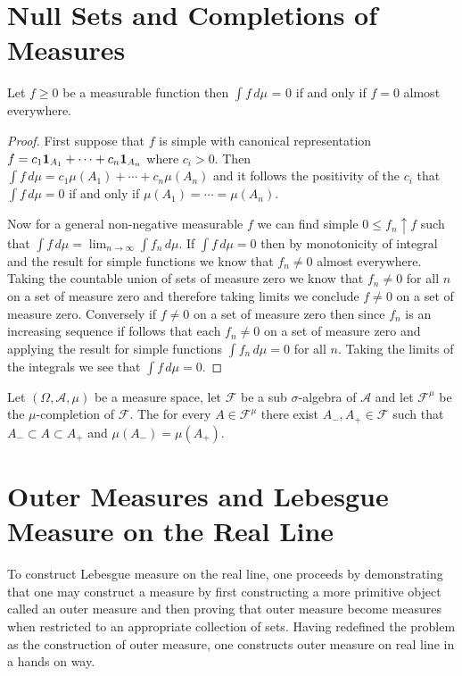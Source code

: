 \section{Null Sets and Completions of Measures}
\begin{lem}Let $f \geq 0$ be a measurable function then $\int f \,
  d\mu$ = 0 if and only if $f = 0$ almost everywhere.
\end{lem}
\begin{proof}
First suppose that $f$ is simple with canonical representation $f = c_1
\textbf{1}_{A_1} + \dotsb +  c_n
\textbf{1}_{A_n}$ where $c_i > 0$.  Then $\int f \, d\mu = c_1
\mu(A_1) + \dotsb +  c_n
\mu(A_n)$ and it follows the positivity of the $c_i$ that $\int f \, d\mu =0$ if and only if
$\mu(A_1) = \dotsb = \mu(A_n)$.

Now for a general non-negative measurable $f$ we can find simple $0
\leq f_n \uparrow f$ such that $\int f \, d\mu = \lim_{n \to \infty}
\int f_n \, d\mu$.  If $\int f\, d\mu = 0$ then by monotonicity of
integral and the result for simple functions we know that $f_n \neq 0$
almost everywhere.  Taking the countable union of sets of measure zero we know
that $f_n \neq 0$ for all $n$ on a set of measure zero and therefore
taking limits we conclude $f \neq 0$ on a set of measure zero.
Conversely if $f \neq 0$ on a set of measure zero then since $f_n$ is
an increasing sequence if follows that each $f_n \neq 0$ on a set of
measure zero and applying the result for simple functions $\int f_n \,
d\mu =0$ for all $n$.  Taking the limits of the integrals we see that
$\int f \, d\mu =0$.
\end{proof}

\begin{lem}Let $(\Omega, \mathcal{A}, \mu)$ be a measure space, let
  $\mathcal{F}$ be a sub $\sigma$-algebra of $\mathcal{A}$ and let
  $\mathcal{F}^{\mu}$ be the $\mu$-completion of $\mathcal{F}$.  The
  for every $A \in \mathcal{F}^{\mu}$ there exist $A_-, A_+ \in
  \mathcal{F}$ such that $A_- \subset A \subset A_+$ and $\mu(A_-) = \mu(A_+)$.
\end{lem}

\section{Outer Measures and Lebesgue Measure on the Real Line}
To construct Lebesgue measure on the real line, one proceeds by
demonstrating that one may construct a measure by first constructing a more
primitive object called an outer measure and then proving that outer
measure become measures when restricted to an appropriate collection
of sets.  Having redefined the problem as the construction of outer
measure, one constructs outer measure on real line in a hands on way.

